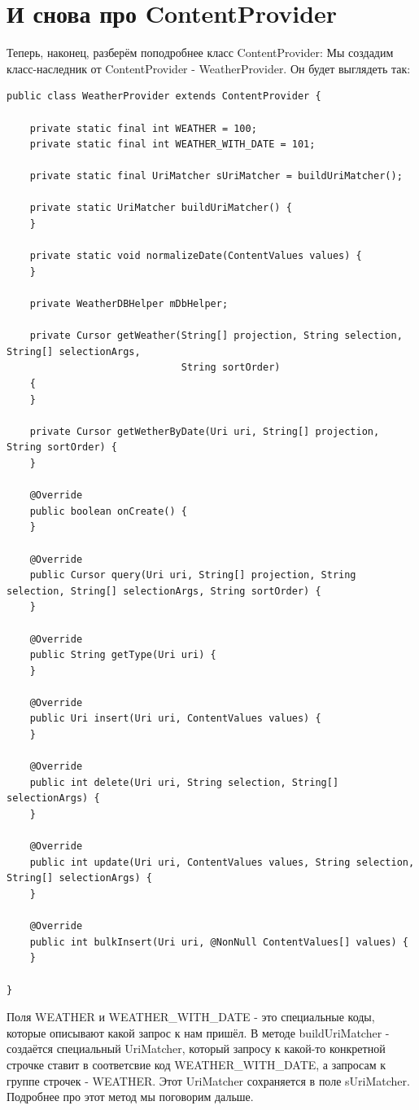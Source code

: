 \documentclass[12 pt]{article}
\begin{document}
\section{И снова про ContentProvider}	
	
	Теперь, наконец, разберём поподробнее класс ContentProvider:
	Мы создадим класс-наследник от ContentProvider - WeatherProvider. Он будет выглядеть так:
	    \begin{lstlisting}
public class WeatherProvider extends ContentProvider {

    private static final int WEATHER = 100;
    private static final int WEATHER_WITH_DATE = 101;

    private static final UriMatcher sUriMatcher = buildUriMatcher();

    private static UriMatcher buildUriMatcher() {
    }

    private static void normalizeDate(ContentValues values) {
    }

    private WeatherDBHelper mDbHelper;

    private Cursor getWeather(String[] projection, String selection, String[] selectionArgs,
                              String sortOrder)
    {
    }

    private Cursor getWetherByDate(Uri uri, String[] projection, String sortOrder) {
    }

    @Override
    public boolean onCreate() {
    }

    @Override
    public Cursor query(Uri uri, String[] projection, String selection, String[] selectionArgs, String sortOrder) {
    }

    @Override
    public String getType(Uri uri) {
    }

    @Override
    public Uri insert(Uri uri, ContentValues values) {
    }

    @Override
    public int delete(Uri uri, String selection, String[] selectionArgs) {
    }

    @Override
    public int update(Uri uri, ContentValues values, String selection, String[] selectionArgs) {
    }

    @Override
    public int bulkInsert(Uri uri, @NonNull ContentValues[] values) {
    }

}	   
	    \end{lstlisting}
	    
        Поля WEATHER и WEATHER\_WITH\_DATE - это специальные коды, которые описывают какой запрос к нам пришёл. В методе buildUriMatcher - создаётся специальный UriMatcher, который запросу к какой-то конкретной строчке ставит в соответсвие код WEATHER\_WITH\_DATE, а запросам к группе строчек - WEATHER. Этот UriMatcher сохраняется в поле sUriMatcher. Подробнее про этот метод мы поговорим дальше.	    
	    
\end{document}
